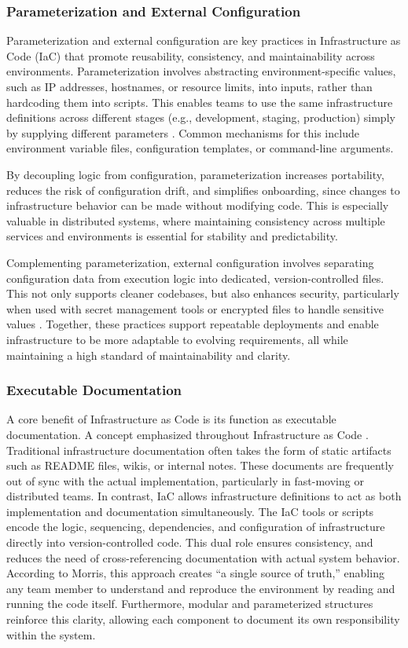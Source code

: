 \subsubsection{Parameterization and External Configuration} \label{parameterization_external_config}
Parameterization and external configuration are key practices in Infrastructure as Code (IaC) that promote reusability, consistency, and maintainability across environments. Parameterization involves abstracting environment-specific values, such as IP addresses, hostnames, or resource limits, into inputs, rather than hardcoding them into scripts. This enables teams to use the same infrastructure definitions across different stages (e.g., development, staging, production) simply by supplying different parameters \citep{morris_2020}. Common mechanisms for this include environment variable files, configuration templates, or command-line arguments.

By decoupling logic from configuration, parameterization increases portability, reduces the risk of configuration drift, and simplifies onboarding, since changes to infrastructure behavior can be made without modifying code. This is especially valuable in distributed systems, where maintaining consistency across multiple services and environments is essential for stability and predictability.

Complementing parameterization, external configuration involves separating configuration data from execution logic into dedicated, version-controlled files. This not only supports cleaner codebases, but also enhances security, particularly when used with secret management tools or encrypted files to handle sensitive values \citep{morris_2020}. Together, these practices support repeatable deployments and enable infrastructure to be more adaptable to evolving requirements, all while maintaining a high standard of maintainability and clarity.


\subsubsection{Executable Documentation} \label{IaCDocumentation}
A core benefit of Infrastructure as Code is its function as executable documentation. A concept emphasized throughout Infrastructure as Code \citep{morris_2020}. Traditional infrastructure documentation often takes the form of static artifacts such as README files, wikis, or internal notes. These documents are frequently out of sync with the actual implementation, particularly in fast-moving or distributed teams. In contrast, IaC allows infrastructure definitions to act as both implementation and documentation simultaneously. The IaC tools or scripts encode the logic, sequencing, dependencies, and configuration of infrastructure directly into version-controlled code. This dual role ensures consistency, and reduces the need of cross-referencing documentation with actual system behavior. According to Morris, this approach creates “a single source of truth,” enabling any team member to understand and reproduce the environment by reading and running the code itself. Furthermore, modular and parameterized structures reinforce this clarity, allowing each component to document its own responsibility within the system. 

